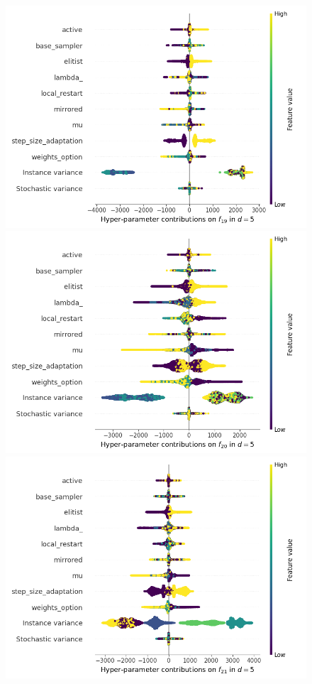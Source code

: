 \begin{figure}[t]
	\includegraphics[height=0.15\textheight,trim=60mm 0mm 30mm 0mm,clip]{cma_img_new/img_summary_f19_d5.png}
	\includegraphics[height=0.15\textheight,trim=60mm 0mm 0mm 0mm,clip]{cma_img_new/img_summary_f20_d5.png}
	\includegraphics[height=0.15\textheight,trim=0mm 0mm 30mm 0mm,clip]{cma_img_new/img_summary_f21_d5.png}

\end{figure}
